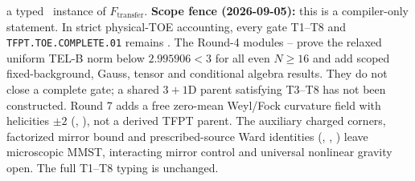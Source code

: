 \documentclass[11pt,a4paper]{article}
\begin{document}
\begin{keybox}
a typed \mC\ instance of $F_{\mathrm{transfer}}$.
\textbf{Scope fence (2026-09-05):} this is a compiler-only statement.  In strict physical-TOE
accounting, every gate T1--T8 and \texttt{TFPT.TOE.COMPLETE.01} remains \mO.
The Round-4 modules
--
prove the relaxed uniform TEL-B norm below $2.995906<3$ for all even $N\ge16$
and add scoped fixed-background, Gauss, tensor and conditional algebra results.
They do not close a complete gate; a shared $3{+}1$D parent satisfying T3--T8
has not been constructed.
Round 7 adds a free zero-mean Weyl/Fock curvature field with helicities
$\pm2$ (,
), not a derived TFPT parent.
The auxiliary charged corners, factorized mirror bound and prescribed-source
Ward identities (,
, )
leave microscopic MMST, interacting mirror control and universal nonlinear
gravity open. The full T1--T8 typing is unchanged.
\end{keybox}
\end{document}

